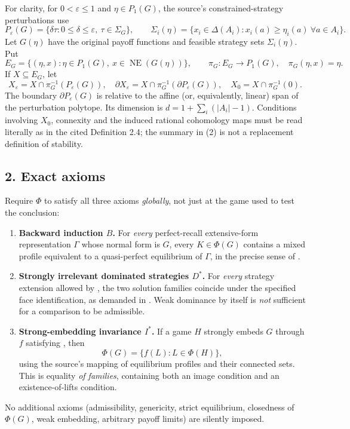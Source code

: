 \documentclass[11pt]{article}
\newcommand{\NE}{\operatorname{NE}}
\begin{document}
For clarity, for $0<\varepsilon\leq1$ and $\eta\in P_1(G)$,
the source's constrained-strategy perturbations use
\[
 P_\varepsilon(G)=\{\delta\tau:0\le\delta\le\varepsilon,
                                 \ \tau\in\Sigma_G\},
 \qquad
 \Sigma_i(\eta)=\{x_i\in\Delta(A_i):x_i(a)\ge\eta_i(a)
                                         \ \forall a\in A_i\}.
 \tag{2}\label{eq:perturb}
\]
Let $G(\eta)$ have the original payoff functions and feasible strategy
sets $\Sigma_i(\eta)$. Put
\[
 E_G=\{(\eta,x):\eta\in P_1(G),\ x\in\NE(G(\eta))\},
 \qquad \pi_G:E_G\to P_1(G),\quad \pi_G(\eta,x)=\eta.
\]
If $X\subseteq E_G$, let
\[
 X_\varepsilon=X\cap\pi_G^{-1}(P_\varepsilon(G)),\quad
 \partial X_\varepsilon=X\cap\pi_G^{-1}(\partial P_\varepsilon(G)),
 \quad X_0=X\cap\pi_G^{-1}(0).
\]
The boundary $\partial P_\varepsilon(G)$ is relative to the affine
(or, equivalently, linear) span of the perturbation polytope. Its
dimension is $d=1+\sum_i(|A_i|-1)$. Conditions involving
$X_0$, connexity and the induced rational cohomology maps must be
read literally as in the cited Definition 2.4; the summary in (2) is
not a replacement definition of stability.

\subsection*{2. Exact axioms}
Require $\Phi$ to satisfy all three axioms \emph{globally}, not just
at the game used to test the conclusion:
\begin{enumerate}[label=(\roman*),leftmargin=2.5em]
\item \textbf{Backward induction $B$.} For \emph{every} perfect-recall
extensive-form representation $\Gamma$ whose normal form is $G$,
every $K\in\Phi(G)$ contains a mixed profile equivalent to a
quasi-perfect equilibrium of $\Gamma$, in the precise sense of
\cite[Definition 2.1 and Axiom 3.1]{gw}.
\item \textbf{Strongly irrelevant dominated strategies $D^*$.}
For \emph{every} strategy extension allowed by
\cite[Definition 4.4]{gw}, the two solution families coincide
under the specified face identification, as demanded in
\cite[Axiom 4.7]{gw}. Weak dominance by itself is \emph{not}
sufficient for a comparison to be admissible.
\item \textbf{Strong-embedding invariance $I^*$.} If a game $H$
strongly embeds $G$ through $f$ satisfying
\cite[Definition 5.2]{gw}, then
\[
  \Phi(G)=\{f(L):L\in\Phi(H)\},
  \tag{3}\label{eq:embedding}
\]
using the source's mapping of equilibrium profiles and their
connected sets. This is equality \emph{of families}, containing both
an image condition and an existence-of-lifts condition.
\end{enumerate}
No additional axioms (admissibility, genericity, strict equilibrium,
closedness of $\Phi(G)$, weak embedding, arbitrary payoff limits)
are silently imposed.
\end{document}

